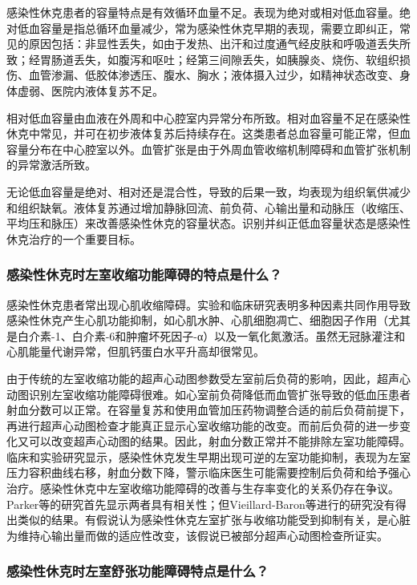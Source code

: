 感染性休克患者的容量特点是有效循环血量不足。表现为绝对或相对低血容量。绝对低血容量是指总循环血量减少，常为感染性休克早期的表现，需要立即纠正，常见的原因包括：非显性丢失，如由于发热、出汗和过度通气经皮肤和呼吸道丢失所致；经胃肠道丢失，如腹泻和呕吐；经第三间隙丢失，如胰腺炎、烧伤、软组织损伤、血管渗漏、低胶体渗透压、腹水、胸水；液体摄入过少，如精神状态改变、身体虚弱、医院内液体复苏不足。

相对低血容量由血液在外周和中心腔室内异常分布所致。相对血容量不足在感染性休克中常见，并可在初步液体复苏后持续存在。这类患者总血容量可能正常，但血容量分布在中心腔室以外。血管扩张是由于外周血管收缩机制障碍和血管扩张机制的异常激活所致。

无论低血容量是绝对、相对还是混合性，导致的后果一致，均表现为组织氧供减少和组织缺氧。液体复苏通过增加静脉回流、前负荷、心输出量和动脉压（收缩压、平均压和脉压）来改善感染性休克的容量状态。识别并纠正低血容量状态是感染性休克治疗的一个重要目标。

\subsubsection{感染性休克时左室收缩功能障碍的特点是什么？}

感染性休克患者常出现心肌收缩障碍。实验和临床研究表明多种因素共同作用导致感染性休克产生心肌功能抑制，如心肌水肿、心肌细胞凋亡、细胞因子作用（尤其是白介素-1、白介素-6和肿瘤坏死因子-α）以及一氧化氮激活。虽然无冠脉灌注和心肌能量代谢异常，但肌钙蛋白水平升高却很常见。

由于传统的左室收缩功能的超声心动图参数受左室前后负荷的影响，因此，超声心动图识别左室收缩功能障碍很难。如心室前负荷降低而血管扩张导致的低血压患者射血分数可以正常。在容量复苏和使用血管加压药物调整合适的前后负荷前提下，再进行超声心动图检查才能真正显示心室收缩功能的改变。而前后负荷的进一步变化又可以改变超声心动图的结果。因此，射血分数正常并不能排除左室功能障碍。临床和实验研究显示，感染性休克发生早期出现可逆的左室功能抑制，表现为左室压力容积曲线右移，射血分数下降，警示临床医生可能需要控制后负荷和给予强心治疗。感染性休克中左室收缩功能障碍的改善与生存率变化的关系仍存在争议。Parker等的研究首先显示两者具有相关性；但Vieillard-Baron等进行的研究没有得出类似的结果。有假说认为感染性休克左室扩张与收缩功能受到抑制有关，是心脏为维持心输出量而做的适应性改变，该假说已被部分超声心动图检查所证实。

\subsubsection{感染性休克时左室舒张功能障碍特点是什么？}

